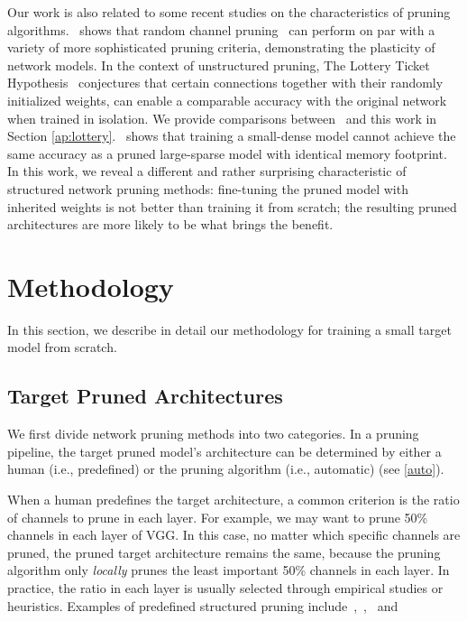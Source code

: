 Our work is also related to some recent studies on the characteristics of pruning algorithms.~\cite{recovering} shows that random channel pruning~\cite{compact} can perform on par with a variety of more sophisticated pruning criteria, demonstrating the plasticity of network models. 
In the context of unstructured pruning, The Lottery Ticket Hypothesis~\cite{lottery} conjectures that  certain connections together with their randomly initialized weights, can enable a comparable accuracy with the original network when trained in isolation. We provide comparisons between~\cite{lottery} and this work in Section \ref{ap:lottery}.~\cite{toprune} shows that training a small-dense model cannot achieve the same accuracy as a pruned large-sparse model with identical memory footprint. In this work, we reveal a different and rather surprising characteristic of structured network pruning methods: fine-tuning the pruned model with inherited weights is not better than training it from scratch; the resulting pruned architectures are more likely to be what brings the benefit.


\section{Methodology}
In this section, we describe in detail our methodology for training a small target model from scratch.


\subsection{Target Pruned Architectures} We first divide network pruning methods into two categories. In a pruning pipeline, the target pruned model's architecture can be determined by either a human (i.e., predefined) or the pruning algorithm (i.e., automatic) (see \autoref{auto}).

When a human predefines the target architecture, a common criterion is the ratio of channels to prune in each layer. For example, we may want to prune 50\% channels in each layer of VGG. In this case, no matter which specific channels are pruned, the pruned target architecture remains the same, because the pruning algorithm only \emph{locally} prunes the least important 50\% channels in each layer. In practice, the ratio in each layer is usually selected through empirical studies or heuristics. Examples of predefined structured pruning include~\cite{li2016pruning},~\cite{luo2017thinet},~\cite{he2017channel} and~\cite{he2018sfp}

